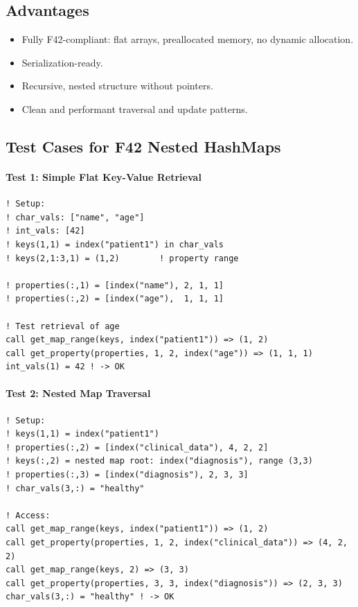 \documentclass{article}
\begin{document}
\subsection{Advantages}

\begin{itemize}
  \item Fully F42-compliant: flat arrays, preallocated memory, no dynamic allocation.
  \item Serialization-ready.
  \item Recursive, nested structure without pointers.
  \item Clean and performant traversal and update patterns.
\end{itemize}

\subsection{Test Cases for F42 Nested HashMaps}

\paragraph{Test 1: Simple Flat Key-Value Retrieval}

\begin{verbatim}
! Setup:
! char_vals: ["name", "age"]
! int_vals: [42]
! keys(1,1) = index("patient1") in char_vals
! keys(2,1:3,1) = (1,2)        ! property range

! properties(:,1) = [index("name"), 2, 1, 1]
! properties(:,2) = [index("age"),  1, 1, 1]

! Test retrieval of age
call get_map_range(keys, index("patient1")) => (1, 2)
call get_property(properties, 1, 2, index("age")) => (1, 1, 1)
int_vals(1) = 42 ! -> OK
\end{verbatim}

\paragraph{Test 2: Nested Map Traversal}

\begin{verbatim}
! Setup:
! keys(1,1) = index("patient1")
! properties(:,2) = [index("clinical_data"), 4, 2, 2]
! keys(:,2) = nested map root: index("diagnosis"), range (3,3)
! properties(:,3) = [index("diagnosis"), 2, 3, 3]
! char_vals(3,:) = "healthy"

! Access:
call get_map_range(keys, index("patient1")) => (1, 2)
call get_property(properties, 1, 2, index("clinical_data")) => (4, 2, 2)
call get_map_range(keys, 2) => (3, 3)
call get_property(properties, 3, 3, index("diagnosis")) => (2, 3, 3)
char_vals(3,:) = "healthy" ! -> OK
\end{verbatim}
\end{document}
